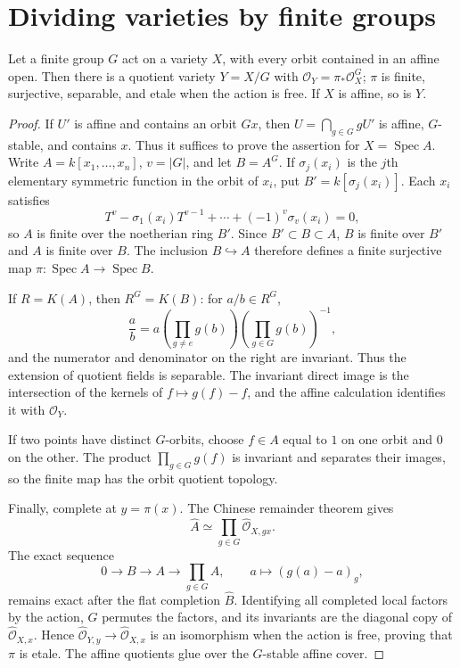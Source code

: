 \section{Dividing varieties by finite groups}
\label{mumford-source-II7}

\begin{theorem}
\label{mumford-thm-finite-group-quotient}
Let a finite group $G$ act on a variety $X$, with every orbit contained in an
affine open. Then there is a quotient variety $Y=X/G$ with
$\mathcal O_Y=\pi_*\mathcal O_X^G$; $\pi$ is finite, surjective, separable,
and etale when the action is free. If $X$ is affine, so is $Y$.
\end{theorem}
\begin{proof}
If $U'$ is affine and contains an orbit $Gx$, then
$U=\bigcap_{g\in G}gU'$ is affine, $G$-stable, and contains $x$.  Thus it
suffices to prove the assertion for $X=\operatorname{Spec}A$.  Write
$A=k[x_1,\ldots,x_n]$, $v=|G|$, and let $B=A^G$.  If $\sigma_j(x_i)$ is
the $j$th elementary symmetric function in the orbit of $x_i$, put
$B'=k[\sigma_j(x_i)]$.  Each $x_i$ satisfies
\[
 T^v-\sigma_1(x_i)T^{v-1}+\cdots+(-1)^v\sigma_v(x_i)=0,
\]
so $A$ is finite over the noetherian ring $B'$.  Since
$B'\subset B\subset A$, $B$ is finite over $B'$ and $A$ is finite over $B$.
The inclusion $B\hookrightarrow A$ therefore defines a finite surjective map
$\pi:\operatorname{Spec}A\to\operatorname{Spec}B$.

If $R=K(A)$, then $R^G=K(B)$: for $a/b\in R^G$,
\[
 \frac ab=a\left(\prod_{g\ne e}g(b)\right)\left(\prod_{g\in G}g(b)\right)^{-1},
\]
and the numerator and denominator on the right are invariant.  Thus the
extension of quotient fields is separable.  The invariant direct image is the
intersection of the kernels of $f\mapsto g(f)-f$, and the affine calculation
identifies it with $\mathcal O_Y$.

If two points have distinct $G$-orbits, choose $f\in A$ equal to $1$ on one
orbit and $0$ on the other.  The product $\prod_{g\in G}g(f)$ is invariant and
separates their images, so the finite map has the orbit quotient topology.

Finally, complete at $y=\pi(x)$.  The Chinese remainder theorem gives
\[
 \widehat A\simeq\prod_{g\in G}\widehat{\mathcal O}_{X,gx}.
\]
The exact sequence
\[
0\to B\to A\to\prod_{g\in G}A,
\qquad a\mapsto(g(a)-a)_g,
\]
remains exact after the flat completion $\widehat B$.  Identifying all
completed local factors by the action, $G$ permutes the factors, and its
invariants are the diagonal copy of $\widehat{\mathcal O}_{X,x}$.  Hence
$\widehat{\mathcal O}_{Y,y}\to\widehat{\mathcal O}_{X,x}$ is an isomorphism
when the action is free, proving that $\pi$ is etale.  The affine quotients
glue over the $G$-stable affine cover.
\end{proof}

